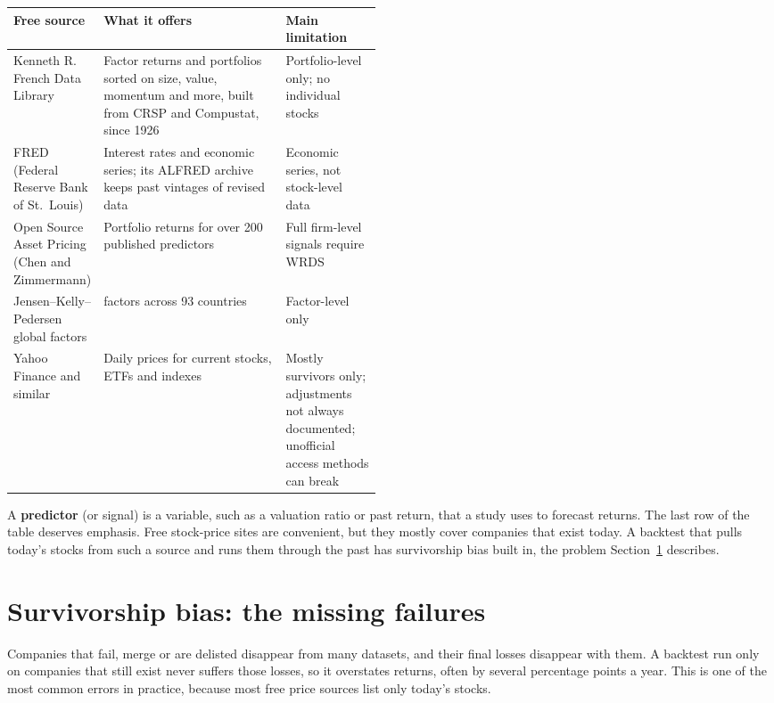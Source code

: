 \begin{center}
\small
\begin{tabularx}{0.9\linewidth}{@{}>{\raggedright\arraybackslash}p{0.22\linewidth}>{\raggedright\arraybackslash}X>{\raggedright\arraybackslash}p{0.26\linewidth}@{}}
\toprule
Free source & What it offers & Main limitation \\
\midrule
Kenneth R. French Data Library & Factor returns and portfolios sorted on size, value, momentum and more, built from CRSP and Compustat, since 1926 & Portfolio-level only; no individual stocks \\
FRED (Federal Reserve Bank of St.\ Louis) & Interest rates and economic series; its ALFRED archive keeps past vintages of revised data & Economic series, not stock-level data \\
Open Source Asset Pricing (Chen and Zimmermann) & Portfolio returns for over 200 published predictors & Full firm-level signals require WRDS \\
Jensen--Kelly--Pedersen global factors & 153 factors across 93 countries & Factor-level only \\
Yahoo Finance and similar & Daily prices for current stocks, ETFs and indexes & Mostly survivors only; adjustments not always documented; unofficial access methods can break \\
\bottomrule
\end{tabularx}
\end{center}

A \textbf{predictor} (or signal) is a variable, such as a valuation ratio or past return, that a study uses to forecast returns. The last row of the table deserves emphasis. Free stock-price sites are convenient, but they mostly cover companies that exist today. A backtest that pulls today's stocks from such a source and runs them through the past has survivorship bias built in, the problem Section~\ref{sec:02-survivorship} describes.

\section{Survivorship bias: the missing failures}
\label{sec:02-survivorship}

Companies that fail, merge or are delisted disappear from many datasets, and
their final losses disappear with them. A backtest run only on companies that
still exist never suffers those losses, so it overstates returns, often by
several percentage points a year. This is one of the most common errors in
practice, because most free price sources list only today's stocks.

